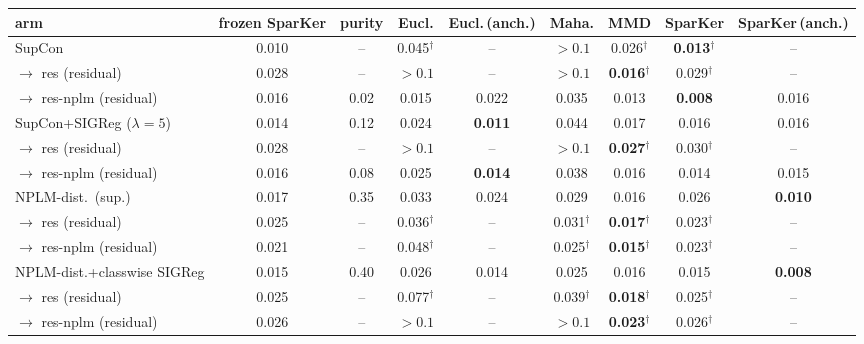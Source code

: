\begin{table}[t]
\centering
\footnotesize
\begin{tabular}{lcccccccc}
\toprule
arm & frozen SparKer & purity & Eucl. & Eucl.\,(anch.) & Maha. & MMD & SparKer & SparKer\,(anch.) \\
\midrule
SupCon & 0.010 & -- & 0.045$^\dagger$ & -- & $>0.1$ & 0.026$^\dagger$ & \textbf{0.013$^\dagger$} & -- \\
\quad $\to$ res (residual) & 0.028 & -- & $>0.1$ & -- & $>0.1$ & \textbf{0.016$^\dagger$} & 0.029$^\dagger$ & -- \\
\quad $\to$ res-nplm (residual) & 0.016 & 0.02 & 0.015 & 0.022 & 0.035 & 0.013 & \textbf{0.008} & 0.016 \\
\addlinespace
SupCon+SIGReg ($\lambda{=}5$) & 0.014 & 0.12 & 0.024 & \textbf{0.011} & 0.044 & 0.017 & 0.016 & 0.016 \\
\quad $\to$ res (residual) & 0.028 & -- & $>0.1$ & -- & $>0.1$ & \textbf{0.027$^\dagger$} & 0.030$^\dagger$ & -- \\
\quad $\to$ res-nplm (residual) & 0.016 & 0.08 & 0.025 & \textbf{0.014} & 0.038 & 0.016 & 0.014 & 0.015 \\
\addlinespace
NPLM-dist.\ (sup.) & 0.017 & 0.35 & 0.033 & 0.024 & 0.029 & 0.016 & 0.026 & \textbf{0.010} \\
\quad $\to$ res (residual) & 0.025 & -- & 0.036$^\dagger$ & -- & 0.031$^\dagger$ & \textbf{0.017$^\dagger$} & 0.023$^\dagger$ & -- \\
\quad $\to$ res-nplm (residual) & 0.021 & -- & 0.048$^\dagger$ & -- & 0.025$^\dagger$ & \textbf{0.015$^\dagger$} & 0.023$^\dagger$ & -- \\
\addlinespace
NPLM-dist.+classwise SIGReg & 0.015 & 0.40 & 0.026 & 0.014 & 0.025 & 0.016 & 0.015 & \textbf{0.008} \\
\quad $\to$ res (residual) & 0.025 & -- & 0.077$^\dagger$ & -- & 0.039$^\dagger$ & \textbf{0.018$^\dagger$} & 0.025$^\dagger$ & -- \\
\quad $\to$ res-nplm (residual) & 0.026 & -- & $>0.1$ & -- & $>0.1$ & \textbf{0.023$^\dagger$} & 0.026$^\dagger$ & -- \\

\end{tabular}
\end{table}
